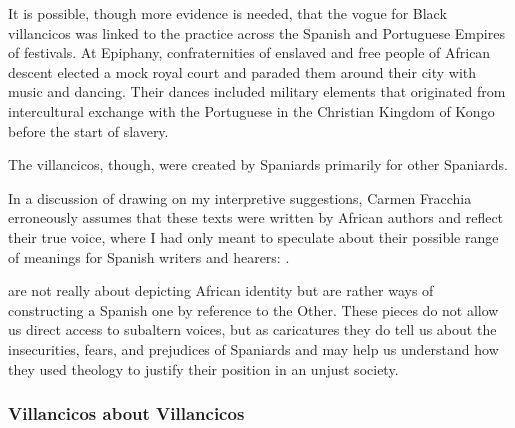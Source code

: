 It is possible, though more evidence is needed, that the vogue for Black
villancicos was linked to the practice across the Spanish and Portuguese
Empires of  festivals.
At Epiphany, confraternities of enslaved and free people of African descent
elected a mock royal court and paraded them around their city with music and
dancing.%
    \Autocites
    {Fromont:DancingKingCongo}
    {Fromont:Kongo}
Their dances included military elements that originated from intercultural
exchange with the Portuguese in the Christian Kingdom of Kongo before the start
of slavery.


The villancicos, though, were created by Spaniards primarily for other
Spaniards.%
\begin{Footnote}
    In a discussion of  drawing on my interpretive
    suggestions, Carmen Fracchia erroneously assumes that these texts were
    written by African authors and reflect their true voice, where I had only
    meant to speculate about their possible range of meanings for Spanish
    writers and hearers:
    \autocite{Fracchia:Black}.
\end{Footnote}
 are not really about depicting African identity but
are rather ways of constructing a Spanish one by reference to the Other.
These pieces do not allow us direct access to subaltern voices, but as
caricatures they do tell us about the insecurities, fears, and prejudices of
Spaniards and may help us understand how they used theology to justify their
position in an unjust society.%
    \Autocites
    [See also][]{Bloechl:RaceEmpire}
    {LoweEarle:BlackAfricansRenaissance}


\subsubsection{Villancicos about Villancicos}


